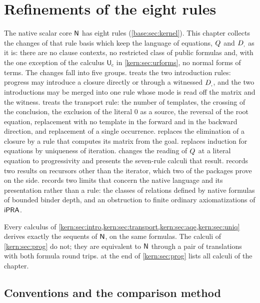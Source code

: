 \chapter{Refinements of the eight rules}
\label{prov:ch:kern}
\label{kern:ch}

The native scalar core $\mathsf{N}$ has eight rules (\cref{base:sec:kernel}).  This
chapter collects the changes of that rule basis which keep the language of
equations, $Q_{}$ and $D_{,}$ as it is: there are no clause contexts, no
restricted class of public formulas and, with the one exception of the
calculus $\mathsf{U}_{\mathrm{c}}$ in \cref{kern:sec:urforms}, no normal
forms of terms.  The changes fall into five groups.   treats the two
introduction rules: progress may introduce a closure directly or through a
witnessed $D_{,}$, and the two introductions may be merged into one rule
whose mode is read off the matrix and the witness.  
treats the transport rule: the number of templates, the crossing of the
conclusion, the exclusion of the literal $0$ as a source, the reversal of the
root equation, replacement with no template in the forward and in the
backward direction, and replacement of a single occurrence.
 replaces the elimination  of a closure by a
rule that computes its matrix from the goal.   replaces induction for equations by
uniqueness of iteration.   changes the reading of $Q_{}$
at a literal equation to progressivity and presents the seven-rule calculi
that result.   records two results on recursors other
than the iterator, which two of the packages prove on the side.
 records two limits that concern the native language and
its presentation rather than a rule: the classes of relations defined by
native formulas of bounded binder depth, and an obstruction to finite
ordinary axiomatizations of $\mathsf{iPRA}$.

Every calculus of
\cref{kern:sec:intro,kern:sec:transport,kern:sec:aqe,kern:sec:uniq}
derives exactly the sequents of $\mathsf{N}$, on the same formulas.  The calculi of
\cref{kern:sec:prog} do not; they are equivalent to $\mathsf{N}$ through a pair of
translations with both formula round trips.   at the
end of \cref{kern:sec:prog} lists all calculi of the chapter.

\section{Conventions and the comparison method}
\label{kern:sec:conv}

